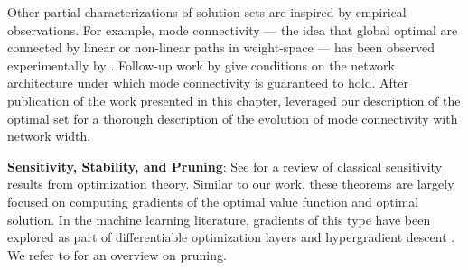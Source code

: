 Other partial characterizations of solution sets are inspired by empirical
observations.
For example, mode connectivity --- the idea that global optimal are connected
by linear or non-linear paths in weight-space --- has been observed
experimentally by \citet{garipov2018mode, draxler2018barriers}.
Follow-up work by \citet{nguyen2019connected, kuditipudi2019connectivity} give
conditions on the network architecture under which mode connectivity is
guaranteed to hold.
After publication of the work presented in this chapter, \citet{kim2024convex}
leveraged our description of the optimal set for a thorough description of the
evolution of mode connectivity with network width.

\textbf{Sensitivity, Stability, and Pruning}:
See \citet{fiacco1990sensitivity} for a review of classical sensitivity results
from optimization theory.
Similar to our work, these theorems are largely focused on computing gradients
of the optimal value function and optimal solution.
In the machine learning literature, gradients of this type have been explored
as part of differentiable optimization layers \citep{agrawal2019differentiable}
and hypergradient descent \citep{baydin2017online}.
We refer to \citet{bialock2020pruning} for an overview on pruning.
